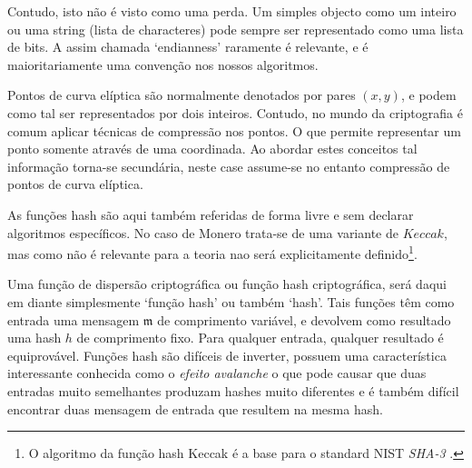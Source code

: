 Contudo, isto não é visto como uma perda. Um simples objecto como um inteiro ou uma string (lista de characteres) pode sempre ser representado como uma lista de bits. A assim chamada `endianness' raramente é relevante, e é maioritariamente uma convenção nos nossos algoritmos. 

Pontos de curva elíptica são normalmente denotados por pares \((x, y)\), e podem como tal ser representados por dois inteiros. Contudo, no mundo da criptografia é comum aplicar técnicas de compressão nos pontos. O que permite representar um ponto somente através de uma coordinada. Ao abordar estes conceitos tal informação torna-se secundária, neste case assume-se no entanto compressão de pontos de curva elíptica. 

As funções hash são aqui também referidas de forma livre e sem declarar algoritmos específicos. No caso de Monero trata-se de uma variante de \(\mathit{Keccak}\), mas como não é relevante para a teoria nao será explicitamente definido\footnote{\label{kekkak_note} O algoritmo da função hash Keccak é a base para o standard NIST {\em SHA-3} \cite{nist-sha3}.}.

Uma função de dispersão criptográfica ou função hash criptográfica, será daqui em diante simplesmente `função hash' ou também `hash'. Tais funções têm como entrada uma mensagem $\mathfrak{m}$ de comprimento variável, e devolvem como resultado uma hash $h$ de comprimento fixo. Para qualquer entrada, qualquer resultado é equiprovável. Funções hash são difíceis de inverter, possuem uma característica interessante conhecida como o {\em efeito avalanche} o que pode causar que duas entradas muito semelhantes produzam hashes muito diferentes e é também difícil encontrar duas mensagem de entrada que resultem na mesma hash. 

